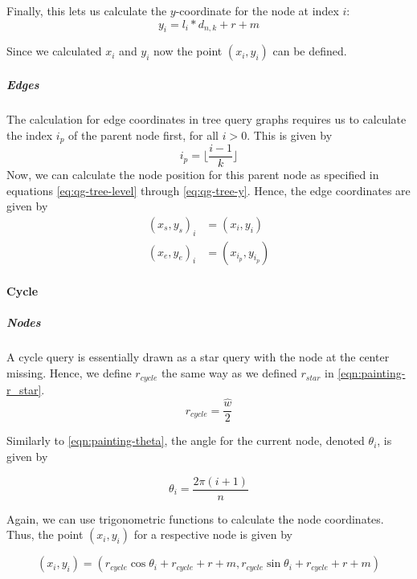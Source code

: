 Finally, this lets us calculate the $y$-coordinate for the node at index $i$:
\begin{equation}
    \label{eq:qg-tree-y}
    y_i = l_i * d_{n,k} + r + m
\end{equation}

Since we calculated $x_i$ and $y_i$ now the point $(x_i, y_i)$ can be defined.

\subparagraph{Edges}
The calculation for edge coordinates in tree query graphs requires us to calculate the index $i_p$ of the parent node first, for all $i > 0$. This is given by 
\begin{equation}
    i_p = \lfloor \frac{i-1}{k} \rfloor
\end{equation}
Now, we can calculate the node position for this parent node as specified in equations \ref{eq:qg-tree-level} through \ref{eq:qg-tree-y}. Hence, the edge coordinates are given by 
\begin{equation}
    \begin{aligned}
        (x_s, y_s)_i &= (x_i, y_i)\\   
        (x_e, y_e)_i &= (x_{i_p}, y_{i_p})
    \end{aligned}
\end{equation}

\paragraph{Cycle} 

\subparagraph{Nodes} A cycle query is essentially drawn as a star query with the node at the center missing. Hence, we define $r_{cycle}$ the same way as we defined $r_{star}$ in \eqref{eqn:painting-r_star}.
\begin{equation}
    r_{cycle} = \frac{\hat{w}}{2}
\end{equation}

Similarly to \eqref{eqn:painting-theta}, the angle for the current node, denoted $\theta_i$, is given by

\begin{equation}\label{eqn:painting-theta_cycle}
    \theta_i = \frac{2\pi(i+1)}{n}
\end{equation}

Again, we can use trigonometric functions to calculate the node coordinates. Thus, the point $(x_i, y_i)$ for a respective node is given by

\begin{equation}
    (x_i, y_i) = (r_{cycle}\cos{\theta_i} + r_{cycle} + r + m, r_{cycle}\sin{\theta_i} + r_{cycle} + r + m)
\end{equation}

